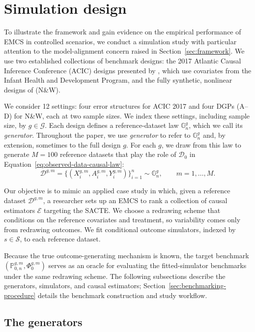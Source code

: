 \section{Simulation design}
\label{sec:simulation-design}

To illustrate the framework and gain evidence on the empirical performance of EMCS in controlled scenarios, we conduct a simulation study with particular attention to the model-alignment concern raised in Section~\ref{sec:framework}. We use two established collections of benchmark designs: the 2017 Atlantic Causal Inference Conference (ACIC) designs presented by , which use covariates from the Infant Health and Development Program, and the fully synthetic, nonlinear designs of  (N\&W).

We consider 12 settings: four error structures for ACIC 2017 and four DGPs (A--D) for N\&W, each at two sample sizes. We index these settings, including sample size, by \(g\in\mathcal G\). Each design defines a reference-dataset law \(\mathbb G_n^{g}\), which we call its \emph{generator}. Throughout the paper, we use \emph{generator} to refer to \(\mathbb G_n^{g}\) and, by extension, sometimes to the full design \(g\). For each \(g\), we draw from this law to generate \(M=100\) reference datasets that play the role of \(\mathcal D_0\) in Equation~\eqref{eq:observed-data-causal-law}:
\[
\mathcal D^{g,m}=\{(X_i^{g,m},A_i^{g,m},Y_i^{g,m})\}_{i=1}^n
\sim\mathbb G_n^{g},
\qquad m=1,\dots,M.
\]

Our objective is to mimic an applied case study in which, given a reference dataset \(\mathcal D^{g,m}\), a researcher sets up an EMCS to rank a collection of causal estimators \(\mathcal E\) targeting the SACTE. We choose a redrawing scheme that conditions on the reference covariates and treatment, so variability comes only from redrawing outcomes. We fit conditional outcome simulators, indexed by \(s\in\mathcal S\), to each reference dataset.

Because the true outcome-generating mechanism is known, the target benchmark \((\mathbb P_{0,n}^{g,m},\Phi_0^{g,m})\) serves as an oracle for evaluating the fitted-simulator benchmarks under the same redrawing scheme. The following subsections describe the generators, simulators, and causal estimators; Section~\ref{sec:benchmarking-procedure} details the benchmark construction and study workflow.

\subsection{The generators}
\label{sec:generators}

